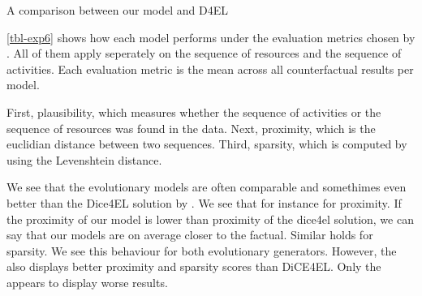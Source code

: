 \documentclass[./../../paper.tex]{subfiles}
\begin{document}
\begin{table}
    \centering    
    \resizebox{\linewidth}{!}{
        
        
    }
\caption{A comparison between our model and D4EL}
\label{tbl-exp6}
\end{table}

\autoref{tbl-exp6} shows how each model performs under the evaluation metrics chosen by \citeauthor{hsieh_DiCE4ELInterpretingProcess_2021}. All of them apply seperately on the sequence of resources and the sequence of activities. Each evaluation metric is the mean across all counterfactual results per model.

First, plausibility, which measures whether the sequence of activities or the sequence of resources was found in the data. Next, proximity, which is the euclidian distance between two sequences. Third, sparsity, which is computed by using the Levenshtein distance. 

We see that the evolutionary models are often comparable and somethimes even better than the Dice4EL solution by \citeauthor{hsieh_DiCE4ELInterpretingProcess_2021}. We see that for instance for proximity. If the proximity of our model is lower than proximity of the dice4el solution, we can say that our models are on average closer to the factual. Similar holds for sparsity. We see this behaviour for both evolutionary generators. However, the \ModelCBG also displays better proximity and sparsity scores than DiCE4EL. Only the \ModelRNG appears to display worse results. 





\end{document}
